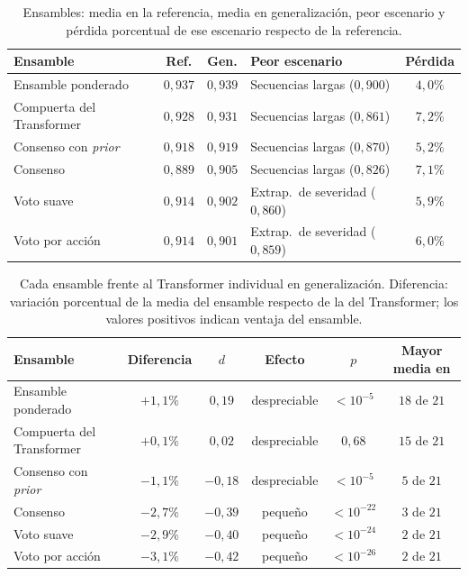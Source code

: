 \documentclass[../00_Main/Main.tex]{subfiles}
\begin{document}
\begin{table}[H]
\centering
\caption[Desempe\~no de los ensambles]{Ensambles: media en la referencia,
media en generalizaci\'on, peor escenario y p\'erdida porcentual de ese
escenario respecto de la referencia.}
\label{tab:ensemble-stress}
\small
\setlength{\tabcolsep}{4pt}
\begin{tabular}{@{}lcclc@{}}
\toprule
\textbf{Ensamble} & \textbf{Ref.} & \textbf{Gen.} & \textbf{Peor escenario} & \textbf{P\'erdida} \\
\midrule
Ensamble ponderado        & $0{,}937$ & $0{,}939$ & Secuencias largas ($0{,}900$) & $4{,}0\%$ \\
Compuerta del Transformer & $0{,}928$ & $0{,}931$ & Secuencias largas ($0{,}861$) & $7{,}2\%$ \\
Consenso con \emph{prior}        & $0{,}918$ & $0{,}919$ & Secuencias largas ($0{,}870$) & $5{,}2\%$ \\
Consenso                  & $0{,}889$ & $0{,}905$ & Secuencias largas ($0{,}826$) & $7{,}1\%$ \\
Voto suave                & $0{,}914$ & $0{,}902$ & Extrap.\ de severidad ($0{,}860$) & $5{,}9\%$ \\
Voto por acci\'on         & $0{,}914$ & $0{,}901$ & Extrap.\ de severidad ($0{,}859$) & $6{,}0\%$ \\
\bottomrule
\end{tabular}
\end{table}

\begin{table}[H]
\centering
\caption[Comparaci\'on de cada ensamble con el Transformer]{Cada ensamble
frente al Transformer individual en generalizaci\'on. Diferencia:
variaci\'on porcentual de la media del ensamble respecto de la del
Transformer; los valores positivos indican ventaja del ensamble.}
\label{tab:trf-vs-ens}
\small
\setlength{\tabcolsep}{4pt}
\begin{tabular}{@{}lccccc@{}}
\toprule
\textbf{Ensamble} & \textbf{Diferencia} & $d$ & \textbf{Efecto} & $p$ & \textbf{Mayor media en} \\
\midrule
Ensamble ponderado        & $+1{,}1\%$ & $0{,}19$  & despreciable & $< 10^{-5}$  & $18$ de $21$ \\
Compuerta del Transformer & $+0{,}1\%$ & $0{,}02$  & despreciable & $0{,}68$     & $15$ de $21$ \\
Consenso con \emph{prior}        & $-1{,}1\%$ & $-0{,}18$ & despreciable & $< 10^{-5}$  & $5$ de $21$ \\
Consenso                  & $-2{,}7\%$ & $-0{,}39$ & peque\~no    & $< 10^{-22}$ & $3$ de $21$ \\
Voto suave                & $-2{,}9\%$ & $-0{,}40$ & peque\~no    & $< 10^{-24}$ & $2$ de $21$ \\
Voto por acci\'on         & $-3{,}1\%$ & $-0{,}42$ & peque\~no    & $< 10^{-26}$ & $2$ de $21$ \\
\bottomrule
\end{tabular}
\end{table}
\end{document}
